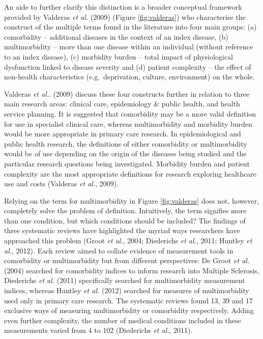 \documentclass[12pt,a4paper,oneside,table]{report}
\begin{document}
An aide to further clarify this distinction is a broader conceptual
framework provided by Valderas \textit{et al.} (2009) (Figure
\ref{fig:valderas}) who characterise the construct of the multiple terms
found in the literature into four main groups: (a) comorbidity --
additional diseases in the context of an index disease, (b)
multimorbidity -- more than one disease within an individual (without
reference to an index disease), (c) morbidity burden -- total impact of
physiological dysfunction linked to disease severity and (d) patient
complexity -- the effect of non-health characteristics
(e.g.~deprivation, culture, environment) on the whole.

Valderas \textit{et al.}. (2009) discuss these four constructs further
in relation to three main research areas: clinical care, epidemiology \&
public health, and health service planning. It is suggested that
comorbidity may be a more valid definition for use in specialist
clinical care, whereas multimorbidity and morbidity burden would be more
appropriate in primary care research. In epidemiological and public
health research, the definitions of either comorbidity or multimorbidity
would be of use depending on the origin of the diseases being studied
and the particular research questions being investigated. Morbidity
burden and patient complexity are the most appropriate definitions for
research exploring healthcare use and costs (Valderas \emph{et al.},
2009).

Relying on the term for multimorbidity in Figure \ref{fig:valderas} does
not, however, completely solve the problem of definition. Intuitively,
the term signifies more than one condition, but which conditions should
be included? The findings of three systematic reviews have highlighted
the myriad ways researchers have approached this problem (Groot \emph{et
al.}, 2004; Diederichs \emph{et al.}, 2011; Huntley \emph{et al.},
2012). Each review aimed to collate evidence of measurement tools in
comorbidity or multimorbidity but from different perspectives: De Groot
\textit{et al.} (2004) searched for comorbidity indices to inform
research into Multiple Sclerosis, Diederichs \textit{et al.} (2011)
specifically searched for multimorbidity measurement indices, whereas
Huntley \textit{et al.} (2012) searched for measures of multimorbidity
used only in primary care research. The systematic reviews found 13, 39
and 17 exclusive ways of measuring multimorbidity or comorbidity
respectively. Adding even further complexity, the number of medical
conditions included in these measurements varied from 4 to 102
(Diederichs \emph{et al.}, 2011).
\end{document}
